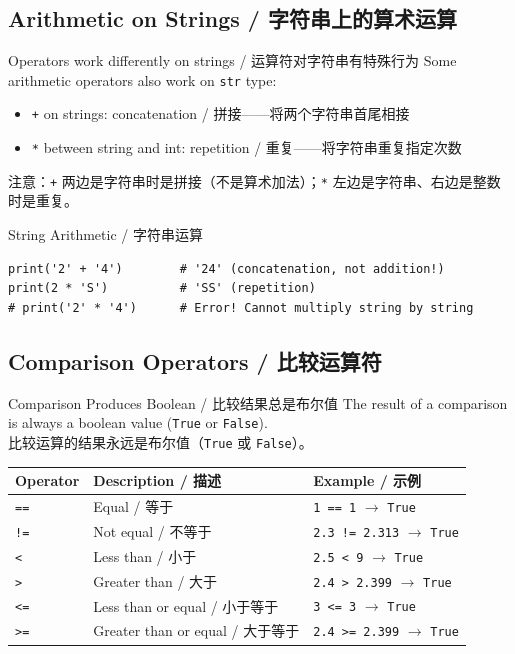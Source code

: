 \documentclass[11pt,a4paper]{report}
\let\oldtexttt\texttt
\renewcommand{\texttt}[1]{\textcolor{mainblue}{\oldtexttt{#1}}}
\begin{document}
\subsection{Arithmetic on Strings / 字符串上的算术运算}

\begin{concept}{Operators work differently on strings / 运算符对字符串有特殊行为}
    Some arithmetic operators also work on \texttt{str} type:
    \begin{itemize}
        \item \texttt{+} on strings: concatenation / 拼接——将两个字符串首尾相接
        \item \texttt{*} between string and int: repetition / 重复——将字符串重复指定次数
    \end{itemize}
    注意：\texttt{+} 两边是字符串时是拼接（不是算术加法）；\texttt{*} 左边是字符串、右边是整数时是重复。
\end{concept}

\begin{examplebox}{String Arithmetic / 字符串运算}
\begin{lstlisting}
print('2' + '4')        # '24' (concatenation, not addition!)
print(2 * 'S')          # 'SS' (repetition)
# print('2' * '4')      # Error! Cannot multiply string by string
\end{lstlisting}
\end{examplebox}

\subsection{Comparison Operators / 比较运算符}

\begin{concept}{Comparison Produces Boolean / 比较结果总是布尔值}
    The result of a comparison is always a boolean value (\texttt{True} or \texttt{False}). \\
    比较运算的结果永远是布尔值（\texttt{True} 或 \texttt{False}）。
\end{concept}

\medskip
\centering
\renewcommand{\arraystretch}{1.5}
\begin{tabular}{@{}lll@{}}
\toprule
\textbf{Operator} & \textbf{Description / 描述} & \textbf{Example / 示例} \\ \midrule
\texttt{==} & Equal / 等于               & \texttt{1 == 1} $\rightarrow$ \texttt{True} \\
\texttt{!=} & Not equal / 不等于          & \texttt{2.3 != 2.313} $\rightarrow$ \texttt{True} \\
\texttt{<}  & Less than / 小于             & \texttt{2.5 < 9} $\rightarrow$ \texttt{True} \\
\texttt{>}  & Greater than / 大于          & \texttt{2.4 > 2.399} $\rightarrow$ \texttt{True} \\
\texttt{<=} & Less than or equal / 小于等于  & \texttt{3 <= 3} $\rightarrow$ \texttt{True} \\
\texttt{>=} & Greater than or equal / 大于等于 & \texttt{2.4 >= 2.399} $\rightarrow$ \texttt{True} \\ \bottomrule
\end{tabular}
\medskip
\end{document}
